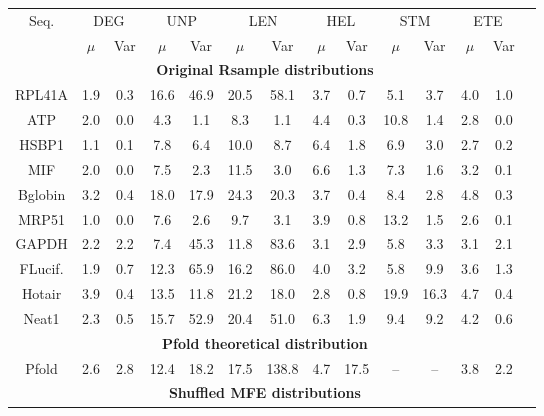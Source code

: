 \documentclass{article}
\begin{document}
\begin{table}[h]
\centering
\begin{tabular}{cccccccccccccc}
\toprule
\multicolumn{1}{c}{Seq.} 
  & \multicolumn{2}{c}{DEG}
  & \multicolumn{2}{c}{UNP}
  & \multicolumn{2}{c}{LEN}
  & \multicolumn{2}{c}{HEL}
  & \multicolumn{2}{c}{STM}
  & \multicolumn{2}{c}{ETE}\\
  & $\mu$ & Var & $\mu$ & Var &  $\mu$ & Var &  $\mu$ & Var &  $\mu$ & Var &  $\mu$ & Var \\
\cmidrule(l){1-13}

\multicolumn{13}{c}{\textbf{Original Rsample distributions}} \\
\cmidrule(l){1-13}

RPL41A & 1.9 & 0.3 & 16.6 & 46.9 & 20.5 & 58.1 & 3.7 & 0.7 & 5.1 & 3.7 & 4.0 & 1.0 \\
ATP    & 2.0 & 0.0 & 4.3 & 1.1 & 8.3 & 1.1 & 4.4 & 0.3 & 10.8 & 1.4 & 2.8 & 0.0 \\
HSBP1  & 1.1 & 0.1 & 7.8 & 6.4 & 10.0 & 8.7 & 6.4 & 1.8 & 6.9 & 3.0 & 2.7 & 0.2 \\
MIF    & 2.0 & 0.0 & 7.5 & 2.3 & 11.5 & 3.0 & 6.6 & 1.3 & 7.3 & 1.6 & 3.2 & 0.1 \\
Bglobin& 3.2 & 0.4 & 18.0 & 17.9 & 24.3 & 20.3 & 3.7 & 0.4 & 8.4 & 2.8 & 4.8 & 0.3 \\
MRP51  & 1.0 & 0.0 & 7.6 & 2.6 & 9.7 & 3.1 & 3.9 & 0.8 & 13.2 & 1.5 & 2.6 & 0.1 \\
GAPDH  & 2.2 & 2.2 & 7.4 & 45.3 & 11.8 & 83.6 & 3.1 & 2.9 & 5.8 & 3.3 & 3.1 & 2.1 \\
FLucif. & 1.9 & 0.7 & 12.3 & 65.9 & 16.2 & 86.0 & 4.0 & 3.2 & 5.8 & 9.9 & 3.6 & 1.3 \\
Hotair & 3.9 & 0.4 & 13.5 & 11.8 & 21.2 & 18.0 & 2.8 & 0.8 & 19.9 & 16.3 & 4.7 & 0.4 \\
Neat1  & 2.3 & 0.5 & 15.7 & 52.9 & 20.4 & 51.0 & 6.3 & 1.9 & 9.4 & 9.2 & 4.2 & 0.6 \\

\cmidrule(l){1-13}
\multicolumn{13}{c}{\textbf{Pfold theoretical distribution}} \\
\cmidrule(l){1-13}

Pfold & 2.6 & 2.8 & 12.4 & 18.2 & 17.5 & 138.8 & 4.7 & 17.5 & -- & -- & 3.8 & 2.2 \\

\cmidrule(l){1-13}
\multicolumn{13}{c}{\textbf{Shuffled MFE distributions}} \\
\cmidrule(l){1-13}


\end{tabular}
\end{table}
\end{document}
